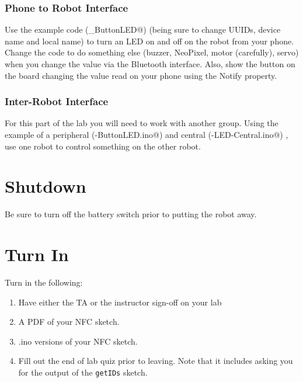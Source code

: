 \subsubsection{Phone to Robot Interface}
Use the example code (\lstinline@BLE_ButtonLED@) (being sure to change UUIDs, device name and local name)
to turn an LED on and off on the robot from your phone. Change the code to 
do something else (buzzer, NeoPixel, motor (carefully), servo) when you change 
the value via the Bluetooth interface. Also, show the button on the board changing
the value read on your phone using the Notify property.

\subsubsection{Inter-Robot Interface}
For this part of the lab you will need to work with another group. Using the example 
of a peripheral (\lstinline@BLE-ButtonLED.ino@) and central (\lstinline@BLE-LED-Central.ino@)
, use one robot to control something on the other robot.



\section{Shutdown}
Be sure to turn off the battery switch prior to putting the robot away.

\section{Turn In}
Turn in the following:
\begin{enumerate}
    \item Have either the TA or the instructor sign-off on your lab
    \item A PDF of your NFC sketch.
    \item .ino versions of your NFC sketch.
    \item Fill out the end of lab quiz prior to leaving. Note that it includes asking you 
            for the output of the \lstinline$getIDs$ sketch. 
\end{enumerate}

